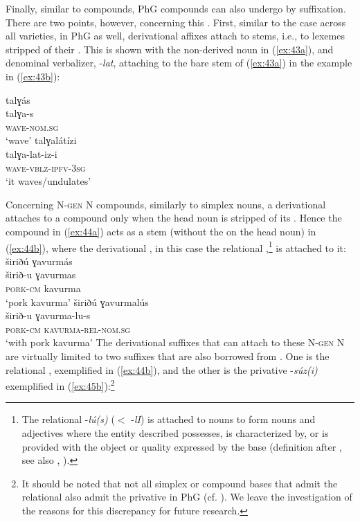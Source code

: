 \documentclass[output=paper]{LSP/langsci}
\begin{document}
Finally, similar to  compounds, PhG compounds can also undergo  by suffixation. There are two points, however, concerning this . First, similar to the case across all  varieties, in PhG as well, derivational affixes attach to stems, i.e., to lexemes stripped of their . This is shown with the non-derived noun in (\ref{ex:43a}), and denominal verbalizer, -\textit{lat}, attaching to the bare stem of (\ref{ex:43a}) in the example in (\ref{ex:43b}):
\begin{multicols}{2}
\ea\label{ex:43}
	\ea\label{ex:43a}
		\glll talɣás\\
				talɣa-s\\
				\textsc{wave-nom.sg}\\
		\glt `wave'
	\ex\label{ex:43b}
		\glll talɣalátízi\\
				talɣa-lat-iz-i\\
				\textsc{wave-vblz-ipfv-3sg}\\
		\glt `it waves/undulates'
	\z
\z
\end{multicols}
Concerning N-\textsc{gen} N compounds, similarly to simplex nouns, a derivational  attaches to a compound only when the head noun is stripped of its . Hence the compound in (\ref{ex:44a}) acts as a stem (without the  on the head noun) in (\ref{ex:44b}), where the derivational , in this case the relational ,\footnote{The relational  -\textit{lú(s)} ($<$  -\textit{lI}) is attached to nouns to form nouns and adjectives where the entity described possesses, is characterized by, or is provided with the object or quality expressed by the base (definition after \citealt[60--61]{GokselKerslake2005}, see also \citealt[445--446]{Kornfilt1997}, \citealt[60--62]{Lewis1967}). } is attached to it:
\ea\label{ex:44}
	\ea\label{ex:44a}
		\glll širiðú ɣavurmás\\
				širið-u ɣavurmas\\
				\textsc{pork-cm} kavurma\\
		\glt `pork kavurma'
	\ex\label{ex:44b}
		\glll širiðú ɣavurmalús\\
				širið-u ɣavurma-lu-s\\
				\textsc{pork-cm} \textsc{kavurma-rel-nom.sg}\\
		\glt `with pork kavurma'
	\z
\z
The derivational suffixes that can attach to these N-\textsc{gen} N are virtually limited to two suffixes that are also borrowed from . One is the relational , exemplified in (\ref{ex:44b}), and the other is the privative  -\textit{súz(i)} exemplified in (\ref{ex:45b}):\footnote{It should be noted that not all simplex or compound bases that admit the relational  also admit the privative  in PhG (cf. \citealt{Bagriaciketalforthcoming}). We leave the investigation of the reasons for this discrepancy for future research. }
\end{document}

